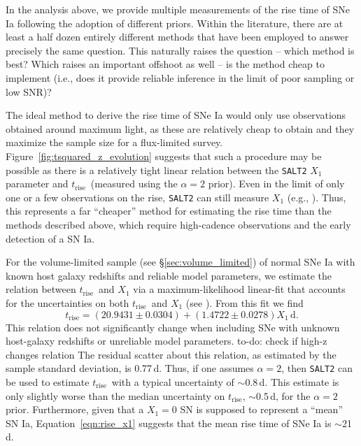 \documentclass[twocolumn]{./aastex63}
\newcommand{\todo}[1]{{\color{magenta} to-do: {#1}}}
\newcommand{\trise}{$t_\mathrm{rise}$}
\begin{document}
In the analysis above, we provide multiple measurements of the rise time of SNe
Ia following the adoption of different priors. Within the literature, there are
at least a half dozen entirely different methods that have been employed to
answer precisely the same question. This naturally raises the question -- which
method is best? Which raises an important offshoot as well -- is the method
cheap to implement (i.e., does it provide reliable inference in the limit of
poor sampling or low SNR)?

The ideal method to derive the rise time of SNe Ia would only use observations
obtained around maximum light, as these are relatively cheap to obtain and they
maximize the sample size for a flux-limited survey.
Figure~\ref{fig:tsquared_z_evolution} suggests that such a procedure may be
possible as there is a relatively tight linear relation between the
\texttt{SALT2} $X_1$ parameter and \trise\ (measured using the $\alpha = 2$
prior). Even in the limit of only one or a few observations on the rise,
\texttt{SALT2} can still measure $X_1$ (e.g., \citealt{Scolnic18a}). Thus, this
represents a far ``cheaper'' method for estimating the rise time than the
methods described above, which require high-cadence observations and the early
detection of a SN Ia.

For the volume-limited sample (see \S\ref{sec:volume_limited}) of normal SNe Ia
with known host galaxy redshifts and reliable model parameters, we estimate the
relation between \trise\ and $X_1$ via a maximum-likelihood linear-fit that
accounts for the uncertainties on both \trise\ and $X_1$ (see \citealt{Hogg10}).
From this fit we find
%
\begin{equation}
    t_\mathrm{rise} = (20.9431 \pm 0.0304) + (1.4722 \pm 0.0278)X_1\,\mathrm{d}.
    \label{eqn:rise_x1}
\end{equation} 
%
This relation does not significantly change when including SNe with unknown
host-galaxy redshifts or unreliable model parameters. \todo{check if high-z
changes relation} The residual scatter about this relation, as estimated by the
sample standard deviation, is 0.77\,d. Thus, if one assumes $\alpha = 2$, then
\texttt{SALT2} can be used to estimate \trise\ with a typical uncertainty of
$\sim$0.8\,d. This estimate is only slightly worse than the median uncertainty
on \trise, $\sim$0.5\,d, for the $\alpha = 2$ prior. Furthermore, given that a
$X_1 = 0$ SN is supposed to represent a ``mean'' SN Ia,
Equation~\ref{eqn:rise_x1} suggests that the mean rise time of SNe Ia is
$\sim$21\,d.
\end{document}
